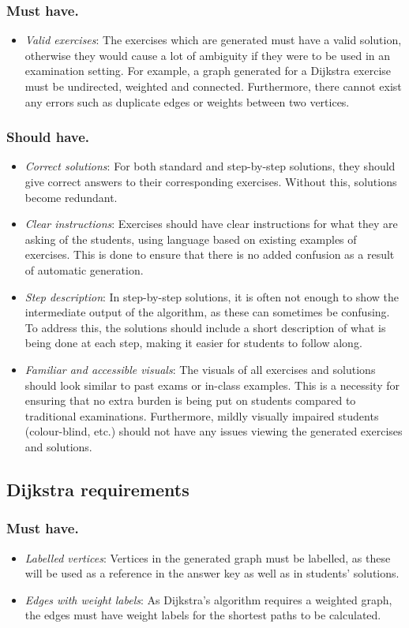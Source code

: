 \documentclass{l4proj}
\begin{document}
\subsubsection{Must have.}
\begin{itemize}
	\item
	\emph{Valid exercises}: The exercises which are generated must have a valid solution, otherwise they would cause a lot of ambiguity if they were to be used in an examination setting. For example, a graph generated for a Dijkstra exercise must be undirected, weighted and connected. Furthermore, there cannot exist any errors such as duplicate edges or weights between two vertices.
\end{itemize}
\subsubsection{Should have.}
\begin{itemize}
	\item
	\emph{Correct solutions}: For both standard and step-by-step solutions, they should give correct answers to their corresponding exercises. Without this, solutions become redundant.
	\item
	\emph{Clear instructions}: Exercises should have clear instructions for what they are asking of the students, using language based on existing examples of exercises. This is done to ensure that there is no added confusion as a result of automatic generation.
	\item
	\emph{Step description}: In step-by-step solutions, it is often not enough to show the intermediate output of the algorithm, as these can sometimes be confusing. To address this, the solutions should include a short description of what is being done at each step, making it easier for students to follow along. 
	\item
	\emph{Familiar and accessible visuals}: The visuals of all exercises and solutions should look similar to past exams or in-class examples. This is a necessity for ensuring that no extra burden is being put on students compared to traditional examinations. Furthermore, mildly visually impaired students (colour-blind, etc.) should not have any issues viewing the generated exercises and solutions.
\end{itemize}
\subsection{Dijkstra requirements}
\label{sec:dijkr}
\subsubsection{Must have.}
\begin{itemize}
	\item
	\emph{Labelled vertices}: Vertices in the generated graph must be labelled, as these will be used as a reference in the answer key as well as in students' solutions. 
	\item
	\emph{Edges with weight labels}: As Dijkstra's algorithm requires a weighted graph, the edges must have weight labels for the shortest paths to be calculated.
\end{itemize}
\end{document}

